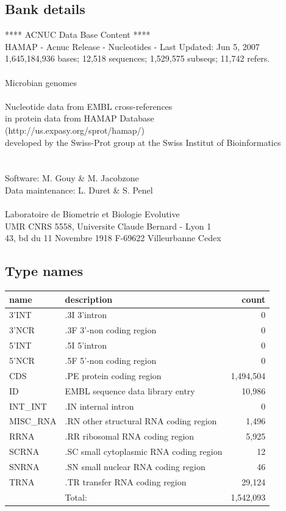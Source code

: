 \documentclass{article}
\begin{document}
\begin{Schunk}
\subsection{Bank details}
               ****     ACNUC Data Base Content      ****                       \\
        HAMAP - Acnuc Release - Nucleotides - Last Updated: Jun  5, 2007\\
1,645,184,936 bases; 12,518 sequences; 1,529,575 subseqs; 11,742 refers.\\
    	  \\
	                   Microbian genomes\\
			   \\
                Nucleotide data from  EMBL cross-references		\\
                  in protein data from  HAMAP Database\\
			(http://us.expasy.org/sprot/hamap/)\\
developed by the Swiss-Prot group at the Swiss Institut of Bioinformatics\\
 \\
 \\
Software: M. Gouy \& M. Jacobzone\\
Data maintenance: L. Duret \& S. Penel\\
 \\
Laboratoire de Biometrie et Biologie Evolutive\\
UMR CNRS 5558, Universite Claude Bernard - Lyon 1 \\
43, bd du 11 Novembre 1918 F-69622 Villeurbanne Cedex\\


\subsection{Type names}
\noindent\begin{tabular}{llr}
\hline \hline
name & description & count \\
\hline
3'INT  &  .3I 3'intron  &  0 \\
3'NCR  &  .3F  3'-non coding region  &  0 \\
5'INT  &  .5I 5'intron  &  0 \\
5'NCR  &  .5F  5'-non coding region  &  0 \\
CDS  &  .PE protein coding region  &  1,494,504 \\
ID  &  EMBL sequence data library entry  &  10,986 \\
INT\_INT  &  .IN  internal intron  &  0 \\
MISC\_RNA  &  .RN other structural RNA coding region  &  1,496 \\
RRNA  &  .RR ribosomal RNA coding region  &  5,925 \\
SCRNA  &  .SC small cytoplasmic RNA coding region  &  12 \\
SNRNA  &  .SN small nuclear RNA coding region  &  46 \\
TRNA  &  .TR transfer RNA coding region  &  29,124 \\
\hline
 & Total: & 1,542,093 \\
\hline \hline
\end{tabular}


\end{Schunk}
\end{document}
